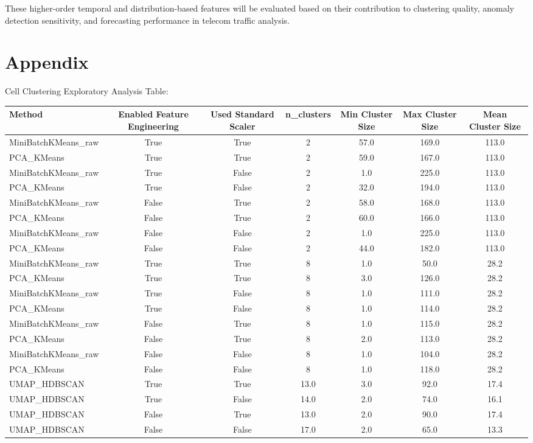 \documentclass[conference]{IEEEtran}
\begin{document}
These higher-order temporal and distribution-based features will be evaluated based on their contribution to clustering quality, anomaly detection sensitivity, and forecasting performance in telecom traffic analysis.
\clearpage
\section{Appendix}

Cell Clustering Exploratory Analysis Table:
\begin{table}[ht]
\centering
\begin{tabular}{l c c c c c c}
\hline
Method & Enabled Feature Engineering & Used Standard Scaler & n\_clusters & Min Cluster Size & Max Cluster Size & Mean Cluster Size \\
\hline
MiniBatchKMeans\_raw & True & True & 2 & 57.0 & 169.0 & 113.0 \\
PCA\_KMeans & True & True & 2 & 59.0 & 167.0 & 113.0 \\
MiniBatchKMeans\_raw & True & False & 2 & 1.0 & 225.0 & 113.0 \\
PCA\_KMeans & True & False & 2 & 32.0 & 194.0 & 113.0 \\
MiniBatchKMeans\_raw & False & True & 2 & 58.0 & 168.0 & 113.0 \\
PCA\_KMeans & False & True & 2 & 60.0 & 166.0 & 113.0 \\
MiniBatchKMeans\_raw & False & False & 2 & 1.0 & 225.0 & 113.0 \\
PCA\_KMeans & False & False & 2 & 44.0 & 182.0 & 113.0 \\
MiniBatchKMeans\_raw & True & True & 8 & 1.0 & 50.0 & 28.2 \\
PCA\_KMeans & True & True & 8 & 3.0 & 126.0 & 28.2 \\
MiniBatchKMeans\_raw & True & False & 8 & 1.0 & 111.0 & 28.2 \\
PCA\_KMeans & True & False & 8 & 1.0 & 114.0 & 28.2 \\
MiniBatchKMeans\_raw & False & True & 8 & 1.0 & 115.0 & 28.2 \\
PCA\_KMeans & False & True & 8 & 2.0 & 113.0 & 28.2 \\
MiniBatchKMeans\_raw & False & False & 8 & 1.0 & 104.0 & 28.2 \\
PCA\_KMeans & False & False & 8 & 1.0 & 118.0 & 28.2 \\
UMAP\_HDBSCAN & True  & True  & 13.0 & 3.0 & 92.0 & 17.4 \\
UMAP\_HDBSCAN & True  & False & 14.0 & 2.0 & 74.0 & 16.1 \\
UMAP\_HDBSCAN & False & True  & 13.0 & 2.0 & 90.0 & 17.4 \\
UMAP\_HDBSCAN & False & False & 17.0 & 2.0 & 65.0 & 13.3 \\
\hline
\end{tabular}
\end{table}
\end{document}
